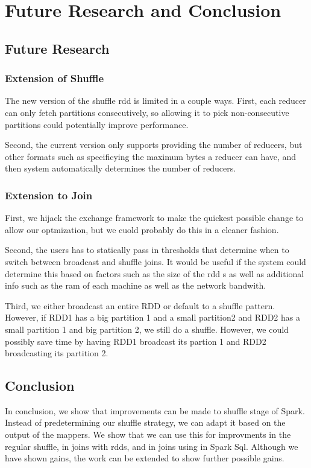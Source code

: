 \chapter{Future Research and Conclusion}

\section{Future Research}

\subsection{Extension of Shuffle}

The new version of the shuffle rdd is limited in a couple ways. First, each reducer can only 
fetch partitions consecutively, so allowing it to pick non-consecutive partitions could potentially 
improve performance.

Second, the current version only supports providing the number of reducers, but other formats such
as specificying the maximum bytes a reducer can have, and then system automatically determines the 
number of reducers.

\subsection {Extension to Join}

First, we hijack the exchange framework to make the quickest possible change to allow our optmization,
but we cuold probably do this in a cleaner fashion.

Second, the users has to statically pass in thresholds that determine when to switch between broadcast and
shuffle joins. It would be useful if the system could determine this based on factors such as the size of the rdd
s as well as additional info such as the ram of each machine as well as the network bandwith.

Third, we either broadcast an entire RDD or default to a shuffle pattern. However, if RDD1 has a big partition 1 and
a small partition2 and RDD2 has a small partition 1 and big partition 2, we still do a shuffle. However, we could possibly save time
by having RDD1 broadcast its partion 1 and RDD2 broadcasting its partition 2.


\section {Conclusion}
In conclusion, we show that improvements can be made to shuffle stage of Spark.
Instead of predetermining our shuffle strategy, we can adapt it based on the output of the mappers.
We show that we can use this for improvments in the regular shuffle, in joins with rdds, and in 
joins using in Spark Sql. Although we have shown gains, the work can be extended to show further possible gains. 



